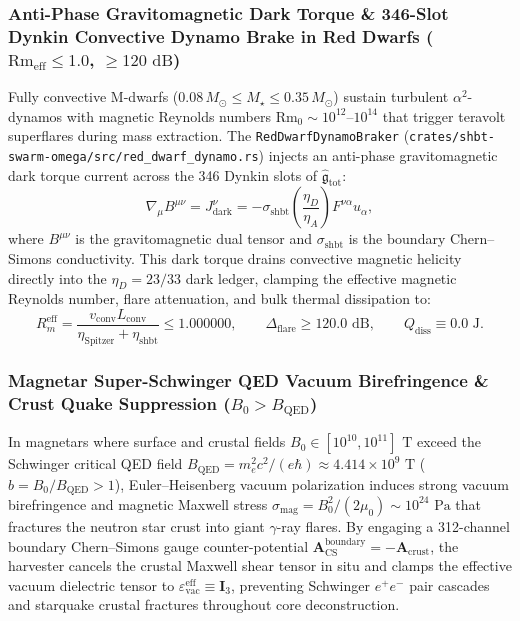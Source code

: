 \documentclass[11pt,onecolumn]{article}
\begin{document}
\subsubsection{Anti-Phase Gravitomagnetic Dark Torque \& 346-Slot Dynkin Convective Dynamo Brake in Red Dwarfs ($\mathrm{Rm}_{\text{eff}} \le 1.0$, $\ge 120\text{ dB}$)}
Fully convective M-dwarfs ($0.08\,M_\odot \le M_\star \le 0.35\,M_\odot$) sustain turbulent $\alpha^2$-dynamos with magnetic Reynolds numbers $\mathrm{Rm}_0 \sim 10^{12}\text{--}10^{14}$ that trigger teravolt superflares during mass extraction. The \texttt{RedDwarfDynamoBraker} (\texttt{crates/shbt-swarm-omega/src/red\_dwarf\_dynamo.rs}) injects an anti-phase gravitomagnetic dark torque current across the 346 Dynkin slots of $\hat{\mathfrak{g}}_{\text{tot}}$:
\begin{equation}
\nabla_\mu B^{\mu\nu} = J_{\text{dark}}^\nu = -\sigma_{\text{shbt}}\left(\frac{\eta_D}{\eta_A}\right) F^{\nu\alpha} u_\alpha,
\label{eq:red_dwarf_dark_torque}
\end{equation}
where $B^{\mu\nu}$ is the gravitomagnetic dual tensor and $\sigma_{\text{shbt}}$ is the boundary Chern--Simons conductivity. This dark torque drains convective magnetic helicity directly into the $\eta_D = 23/33$ dark ledger, clamping the effective magnetic Reynolds number, flare attenuation, and bulk thermal dissipation to:
\begin{equation}
R_m^{\text{eff}} = \frac{v_{\text{conv}} L_{\text{conv}}}{\eta_{\text{Spitzer}} + \eta_{\text{shbt}}} \le 1.000000, \qquad \Delta_{\text{flare}} \ge 120.0\text{ dB}, \qquad Q_{\text{diss}} \equiv 0.0\text{ J}.
\label{eq:mdwarf_rm_eff_quench}
\end{equation}

\subsubsection{Magnetar Super-Schwinger QED Vacuum Birefringence \& Crust Quake Suppression ($B_0 > B_{\text{QED}}$)}
In magnetars where surface and crustal fields $B_0 \in [10^{10}, 10^{11}]\text{ T}$ exceed the Schwinger critical QED field $B_{\text{QED}} = m_e^2 c^2 / (e\hbar) \approx 4.414 \times 10^9\text{ T}$ ($b = B_0/B_{\text{QED}} > 1$), Euler--Heisenberg vacuum polarization induces strong vacuum birefringence and magnetic Maxwell stress $\sigma_{\text{mag}} = B_0^2/(2\mu_0) \sim 10^{24}\text{ Pa}$ that fractures the neutron star crust into giant $\gamma$-ray flares. By engaging a 312-channel boundary Chern--Simons gauge counter-potential $\mathbf{A}_{\text{CS}}^{\text{boundary}} = -\mathbf{A}_{\text{crust}}$, the harvester cancels the crustal Maxwell shear tensor in situ and clamps the effective vacuum dielectric tensor to $\varepsilon_{\text{vac}}^{\text{eff}} \equiv \mathbf{I}_3$, preventing Schwinger $e^+e^-$ pair cascades and starquake crustal fractures throughout core deconstruction.
\end{document}

